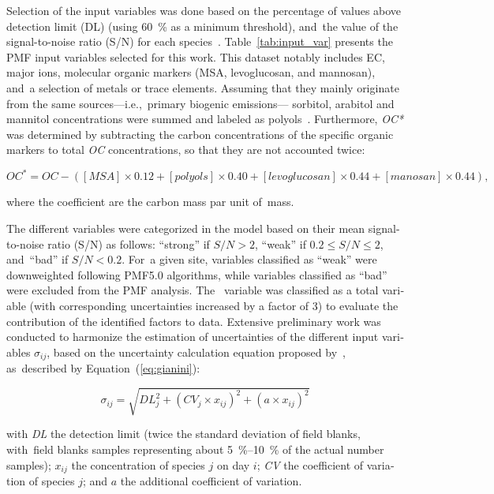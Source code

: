 \begin{otherlanguage}{english}
Selection of the input variables was done based on the percentage of values above
detection limit (DL) (using \SI{60}{\percent} as a minimum threshold), and~the value of
the signal-to-noise ratio (S/N) for each species~\autocite{paateroDiscarding2003}.
Table~\ref{tab:input_var} presents the PMF input variables selected for this work. This
dataset notably includes EC, major ions, molecular organic markers (MSA, levoglucosan, and
mannosan), and~a selection of metals or trace elements. Assuming that they mainly
originate from the same sources---i.e.,~primary biogenic emissions--- sorbitol, arabitol
and mannitol concentrations were summed and labeled as
polyols~\autocite{samakePolyols2019}. Furthermore, \emph{OC*} was determined by
subtracting the carbon concentrations of the specific organic markers to total \emph{OC}
concentrations, so that they are not accounted twice:

\begin{equation}
    OC^* = OC - ([MSA]\times0.12+[polyols]\times0.40+[levoglucosan]\times0.44+[manosan]\times0.44),
\end{equation}

where the coefficient are the carbon mass par unit of~mass.

The different variables were categorized in the model based on their mean signal-to-noise
ratio (S/N) as follows: ``strong'' if $S/N>2$, ``weak'' if $0.2\leq S/N\leq2$, and~``bad''
if $S/N<0.2$. For~a given site, variables classified as ``weak'' were downweighted
following PMF5.0 algorithms, while variables classified as ``bad'' were excluded from the
PMF analysis. The~\PM{} variable was classified as a total variable (with corresponding
uncertainties increased by a factor of 3)   to evaluate the contribution of the identified
factors to \PM{} data.  Extensive preliminary work was conducted to harmonize the
estimation of uncertainties of the different input variables $\sigma_{ij}$, based on the
uncertainty calculation equation proposed by~\textcite{gianiniComparative2012},
as~described by Equation~(\ref{eq:gianini}):

\begin{equation}
    \label{eq:gianini}
    \sigma_{ij} = \sqrt{ DL_j^2 + (CV_j\times x_{ij})^2 + (a\times x_{ij})^2 }
\end{equation}

with \emph{DL} the detection limit (twice the standard deviation of field blanks,
with~field blanks samples representing about \SIrange{5}{10}{\percent} of the actual
number samples); $x_{ij}$ the concentration of species $j$ on day $i$; \emph{CV} the
coefficient of variation of species $j$; and $a$ the additional coefficient of variation.


\end{otherlanguage}
